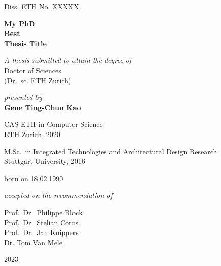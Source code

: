 \newpage

\begin{center}
Diss. ETH No. XXXXX \\
\vspace{1.0cm}

\textbf{\Large{
My PhD\\ \vspace{0.06cm}
Best \\ \vspace{0.22cm}
Thesis Title}} \\

\vspace{1.0cm}

\small{\textit{A thesis submitted to attain the degree of}} \\
\vspace{0.2cm}
\large{Doctor of Sciences\\
(Dr.\ sc. ETH Zurich)}

\vspace{0.4cm}

\small{\textit{presented by}} \\
\vspace{0.2cm}
\textbf{\large{Gene Ting-Chun Kao}} \\

\vspace{0.2cm}

\normalsize{
    CAS ETH in Computer Science \\
    ETH Zurich, 2020 
}

\normalsize{
    M.Sc.\ in Integrated Technologies and Architectural Design Research \\ 
    Stuttgart University, 2016 \\
}

\vspace{0.4cm}

\normalsize{born on 18.02.1990}

\vspace{0.4cm}

\small{\textit{accepted on the recommendation of}} \\
\vspace{0.2cm}

\large{Prof.\ Dr.\ Philippe Block \\
Prof.\ Dr.\ Stelian Coros \\
Prof.\ Dr.\ Jan Knippers \\
Dr. Tom Van Mele
}

\vspace{0.4cm}

\small{2023}

\end{center}

\thispagestyle{empty}

\cleardoublepage{}
\thispagestyle{empty}